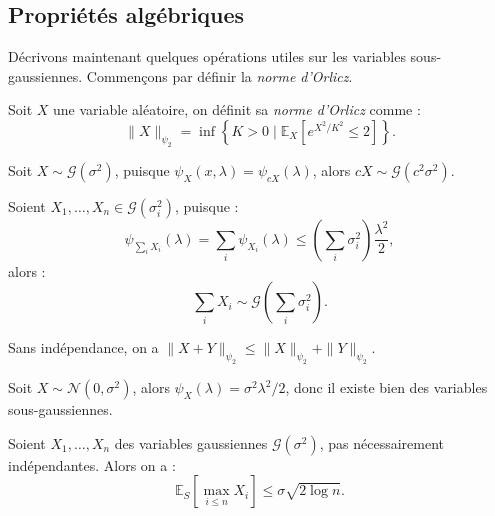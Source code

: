 
\subsection{Propriétés algébriques}

Décrivons maintenant quelques opérations utiles sur les variables sous-gaussiennes. Commençons par définir la \emph{norme d'Orlicz}. 

\begin{definition}
    Soit $X$ une variable aléatoire, on définit sa \emph{norme d'Orlicz} comme : 
    \begin{equation}
        \|X\|_{ \psi_2} = \inf \left\{ K > 0 \mid \mathbb{E}_X \left[ e^{X^2/K^2} \leqslant 2\right] \right\}. 
    \end{equation}
\end{definition}

\begin{proposition}[Scaling]
    Soit $X \sim \mathcal{G}( \sigma^2)$, puisque $ \psi_X(x, \lambda) = \psi_{cX} ( \lambda)$, alors $ cX \sim \mathcal{G}(c^2 \sigma^2)$. 
\end{proposition}

\begin{proposition}[Somme]
    Soient $X_1, \dots, X_n \in \mathcal{G}( \sigma_i^2)$, puisque : 
    $$ 
        \psi_{ \sum_i X_i} ( \lambda) = \sum_i \psi_{X_i}( \lambda) \leqslant \left( \sum_i \sigma_i^2 \right) \frac{ \lambda ^2}{2}, 
    $$ 
    alors : 
    \begin{equation}
        \sum_i X_i \sim \mathcal{G} \left( \sum_i \sigma_i^2\right). 
    \end{equation}
\end{proposition}

\begin{proposition}
    Sans indépendance, on a $ \| X + Y\|_{ \psi_2} \leqslant \|X\|_{\psi_2} + \|Y\|_{\psi_2}$. 
\end{proposition}

\begin{proposition}
    Soit $ X \sim \mathcal{N}(0, \sigma^2)$, alors $ \psi_X( \lambda) = \sigma^2 \lambda^2 / 2$, donc il existe bien des variables sous-gaussiennes. 
\end{proposition}

\begin{proposition}[Maximum]
    Soient $X_1, \dots, X_n$ des variables gaussiennes $ \mathcal{G}( \sigma^2)$, pas nécessairement indépendantes. Alors on a : 
    \begin{equation}
        \mathbb{E}_S \left[ \max_{i \leqslant n} X_i\right] \leqslant \sigma \sqrt{2 \log n}. 
    \end{equation}
\end{proposition}

